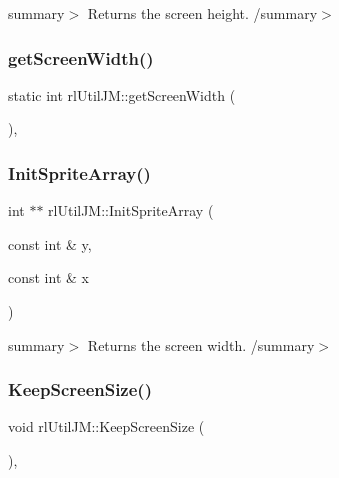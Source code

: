 summary$>$ Returns the screen height. /summary$>$ \mbox{\label{classrl_util_j_m_a72e4969b98d728c9b27b7c515101874f}} 
\subsubsection{\texorpdfstring{get\+Screen\+Width()}{getScreenWidth()}}
{\footnotesize\ttfamily static int rl\+Util\+J\+M\+::get\+Screen\+Width (\begin{DoxyParamCaption}{ }\end{DoxyParamCaption})\hspace{0.3cm}{\ttfamily [inline]}, {\ttfamily [static]}}

\mbox{\label{classrl_util_j_m_ab436632258aae9ef4a26626eddd41d84}} 
\subsubsection{\texorpdfstring{Init\+Sprite\+Array()}{InitSpriteArray()}}
{\footnotesize\ttfamily int $\ast$$\ast$ rl\+Util\+J\+M\+::\+Init\+Sprite\+Array (\begin{DoxyParamCaption}\item[{const int \&}]{y,  }\item[{const int \&}]{x }\end{DoxyParamCaption})\hspace{0.3cm}{\ttfamily [static]}}

summary$>$ Returns the screen width. /summary$>$ \mbox{\label{classrl_util_j_m_a42a91e1b4843f6326c79e7dcd3701d3e}} 
\subsubsection{\texorpdfstring{Keep\+Screen\+Size()}{KeepScreenSize()}}
{\footnotesize\ttfamily void rl\+Util\+J\+M\+::\+Keep\+Screen\+Size (\begin{DoxyParamCaption}{ }\end{DoxyParamCaption})\hspace{0.3cm}{\ttfamily [static]}, {\ttfamily [protected]}}


